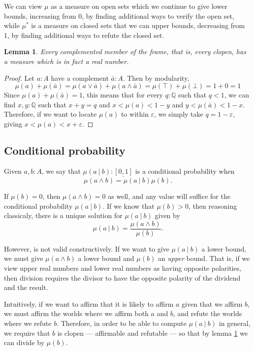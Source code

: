 \documentclass{article}           %
\newtheorem{lemma}{Lemma}
\newcommand{\suchthat}{\ |\ }
\begin{document}
We can view $\mu$ as a measure on open sets which we continue to give lower bounds, increasing from 0, by finding additional ways to verify the open set, while $\mu^*$ is a measure on closed sets that we can upper bounds, decreasing from 1, by finding additional ways to refute the closed set.

\begin{lemma}
\label{comp-real}
Every complemented member of the frame, that is, every clopen, has a measure which is in fact a real number.
\end{lemma}
\begin{proof}
Let $a : A$ have a complement $\bar{a} : A$. Then by modularity, 
\[
\mu(a) + \mu(\bar{a}) = \mu(a \vee \bar{a}) + \mu(a \wedge \bar{a}) = \mu(\top) + \mu(\bot) = 1 + 0 = 1
\]
Since $\mu(a) + \mu(\bar{a}) = 1$, this means that for every $q : \mathbb{Q}$ such that $q < 1$, we can find $x, y : \mathbb{Q}$ such that $x + y = q$ and $x < \mu(a) < 1 - y$ and $y < \mu(\bar{a}) < 1 - x$. Therefore, if we want to locate $\mu(a)$ to within $\varepsilon$, we simply take $q = 1 - \varepsilon$, giving $x < \mu(a) < x + \varepsilon$.
\end{proof}

\subsection{Conditional probability}

Given $a, b : A$, we say that $\mu(a \suchthat b) : \underline{[0,1]}$ is a conditional probability when
\[
\mu(a \wedge b) = \mu(a \suchthat b) \mu(b).
\]

If $\mu(b) = 0$, then $\mu(a \wedge b) = 0$ as well, and any value will suffice for the conditional probability $\mu(a \suchthat b)$. If we know that $\mu(b) > 0$, then reasoning classicaly, there is a unique solution for $\mu(a \suchthat b)$ given by
\[
\mu(a \suchthat b) = \frac{\mu(a \wedge b)}{\mu(b)}.
\]

However, is not valid constructively. If we want to give $\mu(a \suchthat b)$ a lower bound, we must give $\mu(a \wedge b)$ a lower bound and $\mu(b)$ an \emph{upper} bound. That is, if we view upper real numbers and lower real numbers as having opposite polarities, then division requires the divisor to have the opposite polarity of the dividend and the result.

Intuitively, if we want to affirm that it is likely to affirm $a$ given that we affirm $b$, we must affirm the worlds where we affirm both $a$ and $b$, and refute the worlds where we refute $b$. Therefore, in order to be able to compute $\mu(a \suchthat b)$ in general, we require that $b$ is clopen --- affirmable and refutable --- so that by lemma \ref{comp-real} we can divide by $\mu(b)$.
\end{document}
